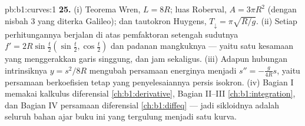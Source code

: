 \begin{solution}{pb:b1:curves:1}
\textbf{25.} (i) Teorema Wren, $L = 8R$; luas Roberval, $A =
3\pi R^2$ (dengan nisbah $3$ yang diterka Galileo); dan tautokron
Huygens, $T_\downarrow = \pi\sqrt{R/g}$. (ii) Setiap
perhitungannya berjalan di atas pemfaktoran setengah sudutnya $f' =
2R\sin\frac t2(\sin\frac t2, \cos\frac t2)$ dan padanan mangkuknya
--- yaitu satu kesamaan yang menggerakkan garis singgung,  dan jam
sekaligus. (iii) Adapun hubungan intrinsiknya $y = s^2/8R$ mengubah
persamaan energinya menjadi $s'' = -\frac{g}{4R}s$, yaitu persamaan 
berkoefisien tetap yang penyelesaiannya persis
isokron. (iv) Bagian I memakai kalkulus diferensial
\cref{ch:b1:derivative}, Bagian II--III 
\cref{ch:b1:integration}, dan Bagian IV persamaan diferensial
\cref{ch:b1:diffeq} --- jadi sikloidnya adalah seluruh bahan ajar buku ini
yang tergulung menjadi satu kurva.

\end{solution}
